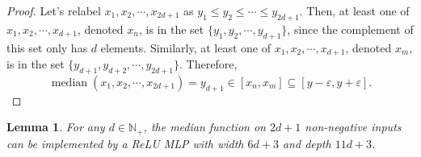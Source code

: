 \documentclass{article}
\numberwithin{equation}{section}
\newtheorem{lemma}{Lemma}[section]
\theoremstyle{definition}
\begin{document}
\begin{proof}
Let's relabel $x_1,x_2,\cdots,x_{2d+1}$ as $y_1 \le y_2 \le \cdots \le y_{2d+1}$. Then, at least one of $x_1,x_2,\cdots,x_{d+1}$, denoted $x_n$, is in the set $\{y_1,y_2,\cdots,y_{d+1} \}$, since the complement of this set only has $d$ elements. Similarly, at least one of $x_1,x_2,\cdots,x_{d+1}$, denoted $x_m$, is in the set $\{y_{d+1},y_{d+2},\cdots,y_{2d+1} \}$. Therefore,
$$\operatorname{median}(x_1,x_2,\cdots,x_{2d+1})=y_{d+1}\in [x_n,x_m]\subseteq [y-\varepsilon, y+\varepsilon].$$
\end{proof}

\begin{lemma}
\label{lem:relu_for_computing_median}
    For any $d\in\mathbb{N}_+$, the median function on $2d+1$ non-negative inputs can be implemented by a ReLU MLP with width $6d+3$ and depth $11d+3$.
\end{lemma}
\end{document}
